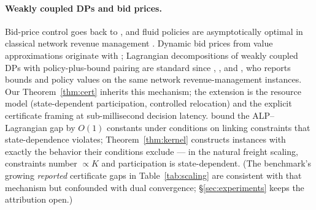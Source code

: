 \documentclass[11pt]{article}
\begin{document}
\paragraph{Weakly coupled DPs and bid prices.} Bid-price control goes
back to \citet{talluri1998bidprice}, and fluid policies are
asymptotically optimal in classical network revenue management
\citep{gallego1997network}. Dynamic bid prices from value
approximations originate with \citet{adelman2007dynamic};
Lagrangian decompositions of weakly coupled DPs with policy-plus-bound
pairing are standard since \citet{hawkins2003lagrangian},
\citet{adelman2008relaxations}, and \citet{topaloglu2009lagrangian}, who
reports bounds and policy values on the same network revenue-management
instances. Our Theorem~\ref{thm:cert} inherits this mechanism; the
extension is the resource model (state-dependent participation,
controlled relocation) and the explicit certificate framing at
sub-millisecond decision latency. \citet{brownzhang2023strength} bound
the ALP--Lagrangian gap by $O(1)$ constants under conditions on linking
constraints that state-dependence violates; Theorem~\ref{thm:kernel}
constructs instances with exactly the behavior their conditions
exclude --- in the natural freight scaling, constraints number
$\propto K$ and participation is state-dependent. (The benchmark's
growing \emph{reported} certificate gaps in Table~\ref{tab:scaling}
are consistent with that mechanism but confounded with dual
convergence; \S\ref{sec:experiments} keeps the attribution open.)
\end{document}
